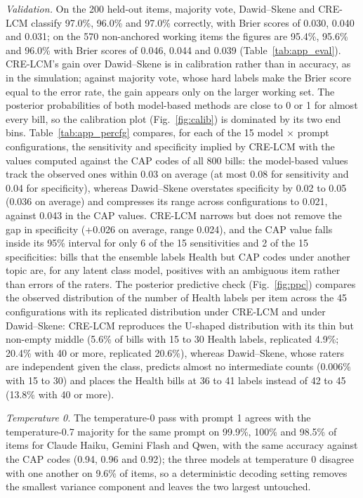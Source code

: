 \emph{Validation.} On the 200 held-out items, majority vote, Dawid--Skene and CRE-LCM classify
97.0\%, 96.0\% and 97.0\% correctly, with Brier scores of 0.030, 0.040 and 0.031; on the 570
non-anchored working items the figures are 95.4\%, 95.6\% and 96.0\% with Brier scores of 0.046,
0.044 and 0.039 (Table~\ref{tab:app_eval}). CRE-LCM's gain over Dawid--Skene is in calibration
rather than in accuracy, as in the simulation; against majority vote, whose hard labels make the
Brier score equal to the error rate, the gain appears only on the larger working set. The
posterior probabilities of both model-based methods are close to 0 or 1 for almost every bill, so
the calibration plot (Fig.~\ref{fig:calib}) is dominated by its two end bins.
Table~\ref{tab:app_percfg} compares, for each of the 15 model $\times$ prompt configurations, the
sensitivity and specificity implied by CRE-LCM with the values computed against the CAP codes of
all 800 bills: the model-based values track the observed ones within 0.03 on average (at most
0.08 for sensitivity and 0.04 for specificity), whereas Dawid--Skene overstates specificity by
0.02 to 0.05 (0.036 on average) and compresses its range across configurations to 0.021, against
0.043 in the CAP values. CRE-LCM narrows but does not remove the gap in specificity (+0.026 on
average, range 0.024), and the CAP value falls inside its 95\% interval for only 6 of the 15
sensitivities and 2 of the 15 specificities: bills that the ensemble labels Health but CAP codes
under another topic are, for any latent class model, positives with an ambiguous item rather than
errors of the raters.
The posterior predictive check (Fig.~\ref{fig:ppc}) compares the observed distribution of the
number of Health labels per item across the 45 configurations with its replicated distribution
under CRE-LCM and under Dawid--Skene: CRE-LCM reproduces the U-shaped distribution with its thin
but non-empty middle (5.6\% of bills with 15 to 30 Health labels, replicated 4.9\%; 20.4\% with 40
or more, replicated 20.6\%), whereas Dawid--Skene, whose raters are independent given the class,
predicts almost no intermediate counts (0.006\% with 15 to 30) and places the Health bills at 36
to 41 labels instead of 42 to 45 (13.8\% with 40 or more).

\emph{Temperature 0.} The temperature-0 pass with prompt 1 agrees with the temperature-0.7
majority for the same prompt on 99.9\%, 100\% and 98.5\% of items for Claude Haiku, Gemini Flash
and Qwen, with the same accuracy against the CAP codes (0.94, 0.96 and 0.92); the three models at
temperature 0 disagree with one another on 9.6\% of items, so a deterministic decoding setting
removes the smallest variance component and leaves the two largest untouched.

